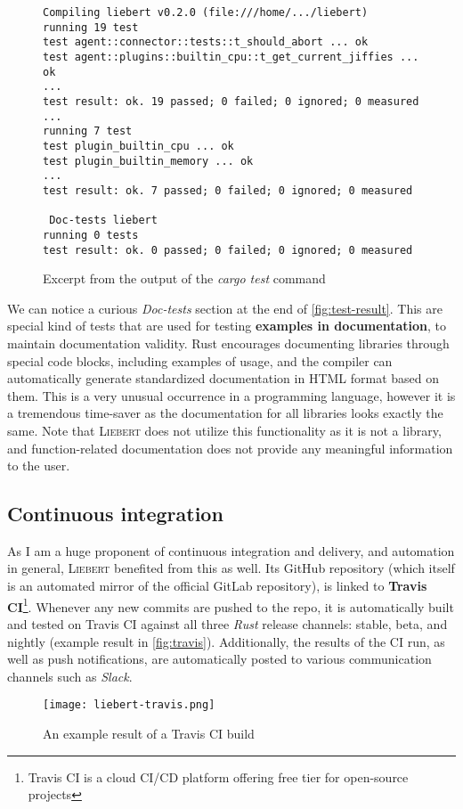         \begin{figure}[!htb]
            \centering
            \begin{BVerbatim}
Compiling liebert v0.2.0 (file:///home/.../liebert)
running 19 test
test agent::connector::tests::t_should_abort ... ok
test agent::plugins::builtin_cpu::t_get_current_jiffies ... ok
...
test result: ok. 19 passed; 0 failed; 0 ignored; 0 measured
...
running 7 test
test plugin_builtin_cpu ... ok
test plugin_builtin_memory ... ok
...
test result: ok. 7 passed; 0 failed; 0 ignored; 0 measured

 Doc-tests liebert
running 0 tests
test result: ok. 0 passed; 0 failed; 0 ignored; 0 measured
            \end{BVerbatim}
            \caption{Excerpt from the output of the \textit{cargo test} command}
            \label{fig:test-result}
        \end{figure}
        
        We can notice a curious \textit{Doc-tests} section at the end of \autoref{fig:test-result}. This are special kind of tests that are used for testing \textbf{examples in documentation}, to maintain documentation validity. Rust encourages documenting libraries through special code blocks, including examples of usage, and the compiler can automatically generate standardized documentation in HTML format based on them. This is a very unusual occurrence in a programming language, however it is a tremendous time-saver as the documentation for all libraries looks exactly the same. Note that \textsc{Liebert} does not utilize this functionality as it is not a library, and function-related documentation does not provide any meaningful information to the user.
        
        
    \subsection{Continuous integration}
        As I am a huge proponent of continuous integration and delivery, and automation in general, \textsc{Liebert} benefited from this as well. Its GitHub repository (which itself is an automated mirror of the official GitLab repository), is linked to \textbf{Travis CI}\footnote{Travis CI is a cloud CI/CD platform offering free tier for open-source projects}. Whenever any new commits are pushed to the repo, it is automatically built and tested on Travis CI against all three \textit{Rust} release channels: stable, beta, and nightly (example result in \autoref{fig:travis}). Additionally, the results of the CI run, as well as push notifications, are automatically posted to various communication channels such as \textit{Slack}.
        
        \begin{center}
            \begin{figure}[!h]
                \texttt{[image: liebert-travis.png]}
                \caption{An example result of a Travis CI build}
                \label{fig:travis}
            \end{figure}
        \end{center}